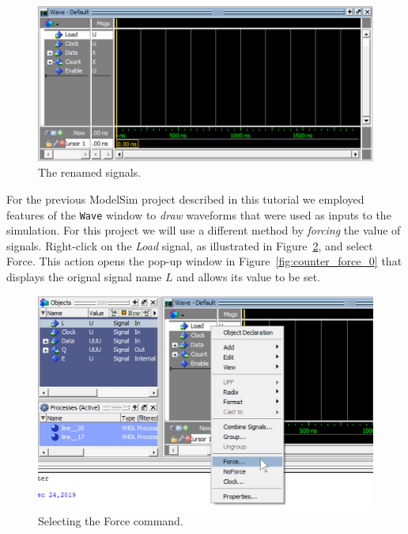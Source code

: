 \documentclass[11pt, twoside, pdftex]{article}
\begin{document}
\begin{figure}[H]
   \begin{center}
      \includegraphics[scale=.75]{figures/counter_names.png}
   \caption{The renamed signals.} 
	 \label{fig:counter_names}
	 \end{center}
\end{figure}

For the previous ModelSim project described in this tutorial we employed features of the \texttt{Wave} window
to {\it draw} waveforms that were used as inputs to the simulation. For this project we will use a
different method by {\it forcing} the value of signals. Right-click on the {\it Load} signal, as 
illustrated in Figure~\ref{fig:counter_force}, and select {\sf Force}. This action opens the pop-up window
in Figure~\ref{fig:counter_force_0} that displays the orignal signal name $L$ and allows its value to be
set. 

\begin{figure}[H]
   \begin{center}
      \includegraphics[scale=.75]{figures/counter_force.png}
       \caption{Selecting the {\sf Force} command.} 
	 \label{fig:counter_force}
	 \end{center}
\end{figure}
\end{document}

